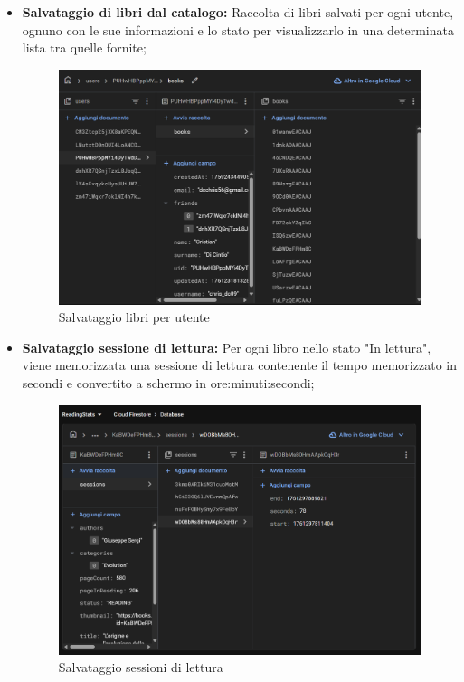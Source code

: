 \documentclass{article}
\begin{document}
\begin{itemize}
\begin{itemize}
    \item \textbf{Salvataggio di libri dal catalogo:} Raccolta di libri salvati per ogni utente, ognuno con le sue informazioni e lo stato per visualizzarlo in una determinata lista tra quelle fornite;
    
    \begin{figure}[H]
      \centering
      \includegraphics[width=0.7\linewidth]{books.png}
      \caption{Salvataggio libri per utente}
      \label{fig:sitemap}
    \end{figure}
    
    \item \textbf{Salvataggio sessione di lettura:} Per ogni libro nello stato "In lettura", viene memorizzata una sessione di lettura contenente il tempo memorizzato in secondi e convertito a schermo in ore:minuti:secondi;
    
    \begin{figure}[H]
      \centering
      \includegraphics[width=0.7\linewidth]{sessions.png}
      \caption{Salvataggio sessioni di lettura}
      \label{fig:sitemap}
    \end{figure}
    

\end{itemize}
\end{itemize}
\end{document}

